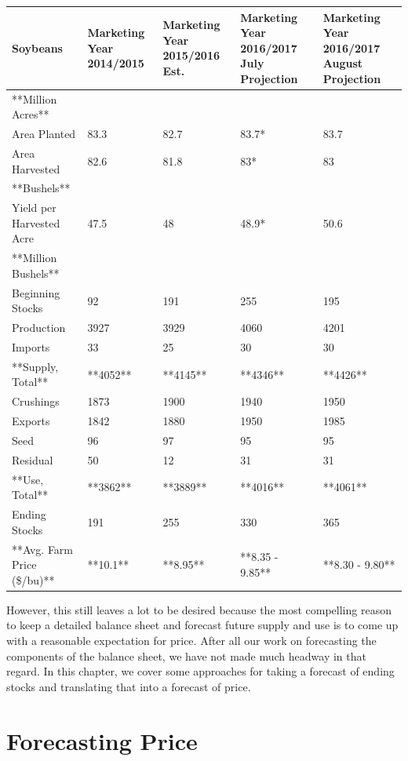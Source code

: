 \documentclass[]{book}
\theoremstyle{definition}
\theoremstyle{definition}
\theoremstyle{remark}
\begin{document}
\begin{tabular}{l|l|l|l|l}
\hline
Soybeans & Marketing Year 2014/2015 & Marketing Year 2015/2016 Est. & Marketing Year 2016/2017 July Projection & Marketing Year 2016/2017 August Projection\\
\hline
**Million Acres** &  &  &  & \\
\hline
Area Planted & 83.3 & 82.7 & 83.7* & 83.7\\
\hline
Area Harvested & 82.6 & 81.8 & 83* & 83\\
\hline
**Bushels** &  &  &  & \\
\hline
Yield per Harvested Acre & 47.5 & 48 & 48.9* & 50.6\\
\hline
**Million Bushels** &  &  &  & \\
\hline
Beginning Stocks & 92 & 191 & 255 & 195\\
\hline
Production & 3927 & 3929 & 4060 & 4201\\
\hline
Imports & 33 & 25 & 30 & 30\\
\hline
**Supply, Total** & **4052** & **4145** & **4346** & **4426**\\
\hline
Crushings & 1873 & 1900 & 1940 & 1950\\
\hline
Exports & 1842 & 1880 & 1950 & 1985\\
\hline
Seed & 96 & 97 & 95 & 95\\
\hline
Residual & 50 & 12 & 31 & 31\\
\hline
**Use, Total** & **3862** & **3889** & **4016** & **4061**\\
\hline
Ending Stocks & 191 & 255 & 330 & 365\\
\hline
**Avg. Farm Price (\$/bu)** & **10.1** & **8.95** & **8.35 - 9.85** & **8.30 - 9.80**\\
\hline
\end{tabular}

However, this still leaves a lot to be desired because the most
compelling reason to keep a detailed balance sheet and forecast future
supply and use is to come up with a reasonable expectation for price.
After all our work on forecasting the components of the balance sheet,
we have not made much headway in that regard. In this chapter, we cover
some approaches for taking a forecast of ending stocks and translating
that into a forecast of price.

\section{Forecasting Price}\label{forecasting-price}
\end{document}
